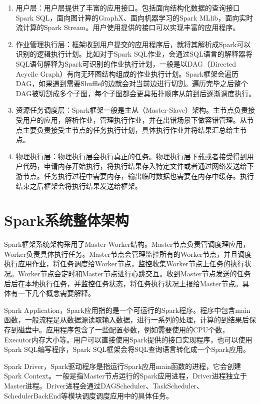 \begin{enumerate}
    \item 用户层：用户层提供了丰富的应用接口。包括面向结构化数据的查询接口Spark SQL，面向图计算的GraphX、面向机器学习的Spark MLlib，面向实时流计算的Spark Stream。用户使用提供的接口可以实现丰富的应用程序。
    \item 作业管理执行层：框架收到用户提交的应用程序后，就将其解析成Spark可以识别的逻辑执行计划。比如对于Spark SQL作业，会通过SQL语言的解释器将SQL语句解释为Spark可识别的作业执行计划，一般是以DAG（Directed Acycilc Graph）有向无环图结构组成的作业执行计划。Spark框架会遍历DAG，如果遇到需要Shuffle的边就会对当前边进行切割。遍历完毕之后整个DAG被切割成多个子图，每个子图都会更具拓扑顺序从前到后逐渐调度执行。
    \item 资源任务调度层：Spark框架一般是主从（Master-Slave）架构。主节点负责接受用户的应用，解析作业，管理执行作业，并在出错场景下做容错管理。从节点主要负责接受主节点的任务执行计划，具体执行作业并将结果汇总给主节点。
    \item 物理执行层：物理执行层会执行真正的任务。物理执行层下载或者接受得到用户代码，申请内存开始执行，将执行结果存入特定文件或者通过网络发送给下游节点。任务执行过程中需要内存，输出临时数据也需要在内存中缓存。执行结束之后框架会将执行结果发送给框架。
\end{enumerate}

\section{Spark系统整体架构}
Spark框架系统架构采用了Master-Worker结构。Master节点负责管调度理应用，Worker负责具体执行任务。Master节点会管理监控所有的Worker节点，并且调度执行应用作业，将任务调度给Worker节点，监控收集Worker节点上任务的执行状况。Worker节点会定时和Master节点进行心跳交互。收到Master节点发送的任务后后在本地执行任务，并监控任务状态，将任务执行状况上报给Master节点。具体有一下几个概念需要解释。

Spark Application，Spark应用指的是一个可运行的Spark程序。程序中包含main函数，一般流程是从数据源读取输入数据，进行一系列的处理，计算的到结果后保存到磁盘中。应用程序包含了一些配置参数，例如需要使用的CPU个数，Executor内存大小等。用户可以直接使用Spark提供的接口实现程序，也可以使用Spark SQL编写程序，Spark SQL框架会将SQL查询语言转化成一个Spark应用。

Spark Driver，Spark驱动程序是指运行Spark应用main函数的进程，它会创建Spark Context。一般是指Master节点运行的Spark应用进程，Driver进程独立于Master进程。Driver进程会通过DAGScheduler、TaskScheduler、SchedulerBackEnd等模块调度调度应用中的具体任务。

